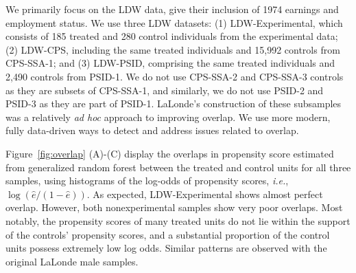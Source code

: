\documentclass[letterpaper,12pt,leqno]{article}
\begin{document}
We primarily focus on the LDW data, give their inclusion of 1974 earnings and employment status. We use three LDW datasets: (1) LDW-Experimental, which consists of 185 treated and 280 control individuals from the experimental data; (2) LDW-CPS, including the same treated individuals and 15,992 controls from CPS-SSA-1; and (3) LDW-PSID, comprising the same treated individuals and 2,490 controls from PSID-1. We do not use CPS-SSA-2 and CPS-SSA-3 controls as they are subsets of CPS-SSA-1, and similarly, we do not use PSID-2 and PSID-3 as they are part of PSID-1. LaLonde's construction of these subsamples was a relatively {\it ad hoc} approach to improving overlap. We use more modern, fully data-driven ways to detect and address issues related to overlap.


Figure~\ref{fig:overlap} (A)-(C) display the overlaps in propensity score estimated from generalized random forest \citep[GRF,][]{athey2019generalized} between the treated and control units for all three samples, using histograms of the log-odds of propensity scores, {\it i.e.}, $\log\left(\hat{e}/(1-\hat{e})\right)$. As expected, LDW-Experimental shows almost perfect overlap. However, both nonexperimental samples show very poor overlaps. Most notably, the propensity scores of many treated units do not lie within the support of the controls' propensity scores, and a substantial proportion of the control units possess extremely low log odds. Similar patterns are observed with the original LaLonde male samples.
\end{document}

